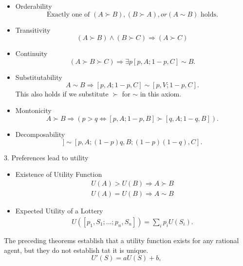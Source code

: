 \documentclass[12pt]{article}
\begin{document}
\begin{itemize}
  \item Orderability
    \begin{equation*}
      \text{Exactly one of } (A \succ B), (B \succ A), or  (A \sim B)
      \text{ holds.}
    \end{equation*}
  \item Transitivity
    \begin{equation*}
      (A \succ B) \land (B \succ C) \Rightarrow (A \succ C)
    \end{equation*}
  \item Continuity
    \begin{equation*}
      (A \succ B \succ C) \Rightarrow \exists p [p, A; 1-p,C] \sim B.
    \end{equation*}
  \item Substitutability
    \begin{equation*}
      A \sim B \Rightarrow [p,A; 1-p,C] \sim [p,V; 1-p,C].
    \end{equation*}
    This also holds if we substitute $\succ$ for $\sim$ in this axiom.
  \item Montonicity
    \begin{equation*}
      A \succ B \Rightarrow
      (p > q \Leftrightarrow [p,A;1-p,B] \succ [q,A;1-q,B]).
    \end{equation*}
  \item Decomposability
    \begin{equation*}
      [p, A; 1-p, [q, B; 1-q, C]] \sim [p, A; (1-p)q, B; (1-p)(1-q), C].
    \end{equation*}
\end{itemize}

3. Preferences lead to utility

\begin{itemize}
  \item Existence of Utility Function
    \begin{eqnarray*}
      U(A) > U(B) \Rightarrow A \succ B \\
      U(A) = U(B) \Rightarrow A \sim B
    \end{eqnarray*}
  \item Expected Utility of a Lottery
    \begin{eqnarray*}
      U([p_1,S_1;...;p_n,S_n]) = \sum_i p_i U(S_i).
    \end{eqnarray*}
\end{itemize}

The preceding theorems establish that a utility function exists for any rational agent, but they do not establish tat it is unique.
\begin{equation*}
  U'(S) = aU(S) + b,
\end{equation*}
\end{document}
